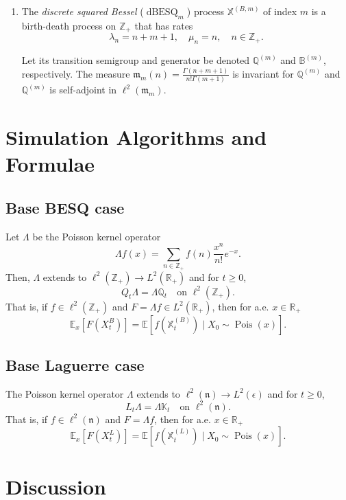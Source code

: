 \documentclass[11pt,a4,reqno]{amsart}
\numberwithin{equation}{section}
\theoremstyle{definition}
\theoremstyle{remark}
\newcommand{\bb}[1]{\mathbb{#1}}
\newcommand{\frk}[1]{\mathfrak{#1}}
\newcommand{\E}{\bb{E}}
\newcommand{\R}{\bb{R}}
\newcommand{\Z}{\bb{Z}}
\DeclareMathOperator{\dbesq}{dBESQ}
\DeclareMathOperator{\pois}{Pois}
\newcommand{\beq}{\begin{equation}}
\newcommand{\eeq}{\end{equation}}
\begin{document}
	\begin{enumerate}
	
		\item The \textit{discrete squared Bessel} ($\dbesq_m$) process $\bb{X}^{(B, m)}$ of index $m$ is a birth-death process on $\Z_+$ that has rates
		\beq \lambda_n = n + m + 1, \quad \mu_n = n , \quad n \in \Z_+. \eeq
		
		Let its transition semigroup and generator be denoted $\bb{Q}^{(m)}$ and $\bb{B}^{(m)}$, respectively. The measure $\frk{m}_m(n) = \frac{\Gamma(n + m + 1)}{n! \Gamma(m + 1)}$ is invariant for $\bb{Q}^{(m)}$ and $\bb{Q}^{(m)}$ is self-adjoint in $\ell^2(\frk{m}_m)$. 

	
	
	\end{enumerate}

	


\section{Simulation Algorithms and Formulae}

\subsection{Base BESQ case} 
	Let $\Lambda$ be the Poisson kernel operator 
	\beq \Lambda f(x) = \sum_{n \in \Z_+} f(n) \frac{x^n}{n!} e^{-x} . \eeq
	Then, $\Lambda$ extends to $\ell^2(\Z_+) \to L^2(\R_+)$ and for $t \geq 0$, 
	\beq Q_t\Lambda = \Lambda \bb{Q}_t \quad \text{on } \ell^2(\Z_+). \eeq
	That is, if $f \in \ell^2(\Z_+)$ and $F = \Lambda f \in L^2(\R_+)$, then for a.e. $x \in \R_+$
	\beq \E_x[F(X_t^{B})] = \E[f(\bb{X}_t^{(B)}) \mid X_0 \sim \pois(x)] . \eeq
	
\subsection{Base Laguerre case} 
	The Poisson kernel operator $\Lambda$ extends to $\ell^2(\frk{n}) \to L^2(\epsilon)$ and for $t \geq 0$, 
	\beq L_t\Lambda = \Lambda \bb{K}_t \quad \text{on } \ell^2(\frk{n}). \eeq
	That is, if $f \in \ell^2(\frk{n})$ and $F = \Lambda f$, then for a.e. $x \in \R_+$
	\beq \E_x[F(X_t^{L})] = \E[f(\bb{X}_t^{(L)}) \mid X_0 \sim \pois(x)] . \eeq



	
\section{Discussion}
\end{document}
